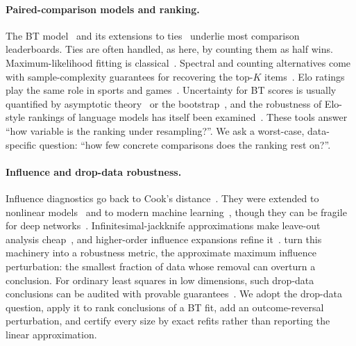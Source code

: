\documentclass{article}
\begin{document}
\paragraph{Paired-comparison models and ranking.}
The BT model~\citep{Bradley1952RankAO} and its extensions to ties~\citep{Davidson1970OnET} underlie most comparison leaderboards. Ties are often handled, as here, by counting them as half wins. Maximum-likelihood fitting is classical~\citep{Hunter2003MMAF}. Spectral and counting alternatives come with sample-complexity guarantees for recovering the top-$K$ items~\citep{Negahban2012RankCR,Chen2015SpectralMT,Chen2017SPECTRALMA,Shah2015SimpleRA}. Elo ratings play the same role in sports and games~\citep{Elo1978TheRO}. Uncertainty for BT scores is usually quantified by asymptotic theory~\citep{Gao2021UncertaintyQI} or the bootstrap~\citep{Efron1979BootstrapMA}, and the robustness of Elo-style rankings of language models has itself been examined~\citep{Boubdir2023EloUR}. These tools answer ``how variable is the ranking under resampling?''. We ask a worst-case, data-specific question: ``how few concrete comparisons does the ranking rest on?''.

\paragraph{Influence and drop-data robustness.}
Influence diagnostics go back to Cook's distance~\citep{Cook2000DetectionOI}. They were extended to nonlinear models~\citep{Monari2000WithdrawingAE} and to modern machine learning~\citep{Koh2017UnderstandingBP}, though they can be fragile for deep networks~\citep{Basu2020InfluenceFI}. Infinitesimal-jackknife approximations make leave-out analysis cheap~\citep{Giordano2018ASA}, and higher-order influence expansions refine it~\citep{Giordano2019AHS,Alaa2020DiscriminativeJQ}. \citet{Broderick2020AnAF} turn this machinery into a robustness metric, the approximate maximum influence perturbation: the smallest fraction of data whose removal can overturn a conclusion. For ordinary least squares in low dimensions, such drop-data conclusions can be audited with provable guarantees~\citep{Moitra2022ProvablyAO}. We adopt the drop-data question, apply it to rank conclusions of a BT fit, add an outcome-reversal perturbation, and certify every size by exact refits rather than reporting the linear approximation.
\end{document}
